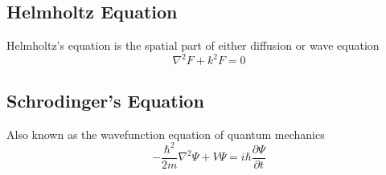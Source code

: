 \documentclass[../main.tex]{subfiles}
\begin{document}
\subsection*{Helmholtz Equation}
Helmholtz's equation is the spatial part of either diffusion or wave equation
\begin{equation*}
    \nabla^2F+k^2F=0
\end{equation*}

\subsection*{Schrodinger's Equation}
Also known as the wavefunction equation of quantum mechanics
\begin{equation*}
    -\frac{\hbar^2}{2m}\nabla^2\Psi+V\Psi= i\hbar\frac{\partial \Psi}{\partial t}
\end{equation*}
\end{document}
